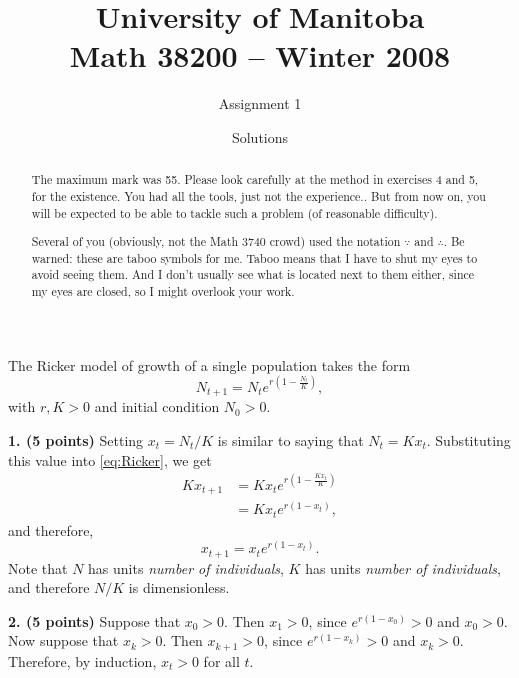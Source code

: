\documentclass[12pt]{article}
\title{University of Manitoba\\ Math 38200 -- Winter 2008}
\author{Assignment 1}
\date{Solutions}
\theoremstyle{plain}
\begin{document}
\maketitle
\begin{abstract}
The maximum mark was 55. Please look carefully at the method in exercises 4 and
5, for the existence. You had all the tools, just not the experience.. But from
now on, you will be expected to be able to tackle such a problem (of reasonable
difficulty).

Several of you (obviously, not the Math 3740 crowd) used the notation
$\because$ and $\therefore$. Be warned: these are taboo symbols for me. Taboo
means that I have to shut my eyes to avoid seeing them. And I don't usually see
what is located next to them either, since my eyes are closed, so I might
overlook your work.
\end{abstract}


\vskip1cm
\noindent
The Ricker model of growth of a single population takes the form
\begin{equation}\label{eq:Ricker}
N_{t+1}=N_t e^{r\left(1-\frac{N_t}K\right)},
\end{equation}
with $r,K>0$ and initial condition $N_0>0$.

\vskip1cm
\noindent
{\bf 1. (5 points)} 
Setting $x_t=N_t/K$ is similar to saying that $N_t=Kx_t$. Substituting this value into \eqref{eq:Ricker}, we get
\begin{align*}
Kx_{t+1} &= Kx_t e^{r\left(1-\frac{Kx_t}K\right)} \\
&= Kx_t e^{r(1-x_t)},
\end{align*}
and therefore,
\begin{equation}\label{eq:Ricker_dimless}
x_{t+1}=x_t e^{r(1-x_t)}.
\end{equation}
Note that $N$ has units \emph{number of individuals}, $K$ has units \emph{number of individuals}, and therefore $N/K$ is dimensionless.

\vskip0.4cm
\noindent
{\bf 2. (5 points)} 
Suppose that $x_0>0$. Then $x_1>0$, since $e^{r(1-x_0)}>0$ and $x_0>0$. Now suppose that $x_k>0$. Then $x_{k+1}>0$, since $e^{r(1-x_k)}>0$ and $x_k>0$. Therefore, by induction, $x_t>0$ for all $t$.
\end{document}
